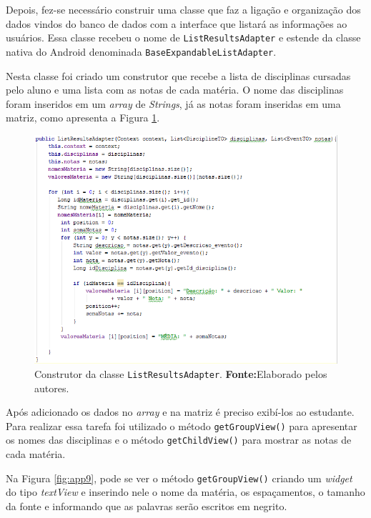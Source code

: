 	\par Depois, fez-se necessário construir uma classe que faz a ligação e
organização dos dados vindos do banco de dados com a interface que listará as
informações ao usuários. Essa classe recebeu o nome de
\texttt{ListResultsAdapter} e estende da classe nativa do Android denominada
\texttt{BaseExpandableListAdapter}.

	\par Nesta classe foi criado um construtor que recebe a lista de disciplinas
cursadas pelo aluno e uma lista com as notas de cada matéria. O nome das
disciplinas foram inseridos em um \textit{array} de \textit{Strings}, já as
notas foram inseridas em uma matriz, como apresenta a Figura \ref{fig:app8}.


		\begin{figure}[h!] 
			\centerline{\includegraphics[scale=0.7]{./imagens/2_q_metodologico/4_procedimentos_resultados/42_aplicativo/app8.png}}
			\caption[Construtor da classe ListResultsAdapter]{Construtor da classe
			\texttt{ListResultsAdapter}.
			\textbf{Fonte:}Elaborado pelos autores.}
			\label{fig:app8}
		\end{figure}
	
	\pagebreak
	
	\par Após adicionado os dados no \textit{array} e na matriz é preciso exibí-los
ao estudante. Para realizar essa tarefa foi utilizado o método
\texttt{getGroupView()} para apresentar os nomes das disciplinas e o método
\texttt{getChildView()} para mostrar as notas de cada matéria.

	\par Na Figura \ref{fig:app9}, pode se ver o método \texttt{getGroupView()}
criando um \textit{widget} do tipo \textit{textView}  e inserindo nele o
nome da matéria, os espaçamentos, o tamanho da fonte e informando que as
palavras serão escritos em negrito.
	
